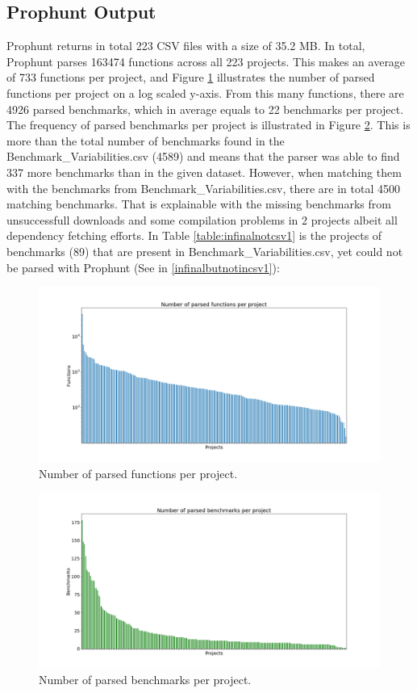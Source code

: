 \documentclass{seal_thesis}
\begin{document}
\subsection{Prophunt Output}

Prophunt returns in total 223 CSV files with a size of 35.2 MB. In total, Prophunt parses 163474 functions across all 223 projects. This makes an average of 733 functions per project, and Figure \ref{fig:parsed} illustrates the number of parsed functions per project on a log scaled y-axis. From this many functions, there are 4926 parsed benchmarks, which in average equals to 22 benchmarks per project. The frequency of parsed benchmarks per project is illustrated in Figure \ref{fig:parsedb}. This is more than the total number of benchmarks found in the Benchmark\_Variabilities.csv (4589) and means that the parser was able to find 337 more benchmarks than in the given dataset. However, when matching them with the benchmarks from Benchmark\_Variabilities.csv, there are in total 4500 matching benchmarks. That is explainable with the missing benchmarks from unsuccessfull downloads and some compilation problems in 2 projects albeit all dependency fetching efforts. In Table \ref{table:infinalnotcsv1} is the projects of benchmarks (89) that are present in Benchmark\_Variabilities.csv, yet could not be parsed with Prophunt (See in \ref{infinalbutnotincsv1}):\\


\begin{figure}[H]
	\centering
	\includegraphics[width=\textwidth]{parsedfunctions}
	\caption{Number of parsed functions per project.}
	\label{fig:parsed}
\end{figure}

\begin{figure}[H]
	\centering
	\includegraphics[width=\textwidth]{parsedbenchmarks}
	\caption{Number of parsed benchmarks per project.}
	\label{fig:parsedb}
\end{figure}
\end{document}
